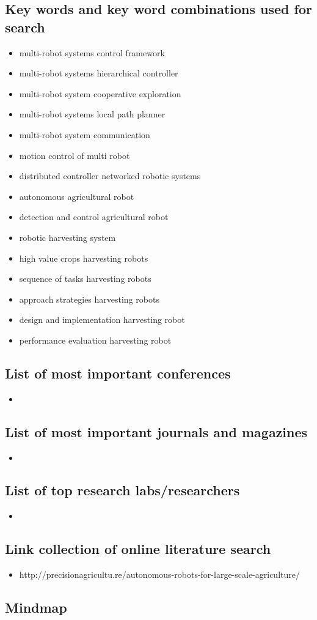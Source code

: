     \subsection{Key words and key word combinations used for search}
    \begin{itemize}
        \item multi-robot systems control framework
        \item multi-robot systems hierarchical controller
        \item multi-robot system cooperative exploration
        \item multi-robot systems local path planner
        \item multi-robot system  communication
        \item motion control of multi robot
        \item distributed controller networked robotic systems
        \item autonomous agricultural robot
        \item detection and control agricultural robot
        \item robotic harvesting system
        \item high value crops harvesting robots
        \item sequence of tasks harvesting robots
        \item approach strategies harvesting robots
        \item design and implementation harvesting robot
        \item performance evaluation harvesting robot
    \end{itemize}
    \subsection{List of most important conferences}
    \begin{itemize}
        \item 
    \end{itemize}
    \subsection{List of most important journals and magazines}
    \begin{itemize}
        \item 
    \end{itemize}
    \subsection{List of top research labs/researchers}
    \begin{itemize}
        \item 
    \end{itemize}
    \subsection{Link collection of online literature search}
    \begin{itemize}
        \item http://precisionagricultu.re/autonomous-robots-for-large-scale-agriculture/
    \end{itemize}
    \subsection{Mindmap}

